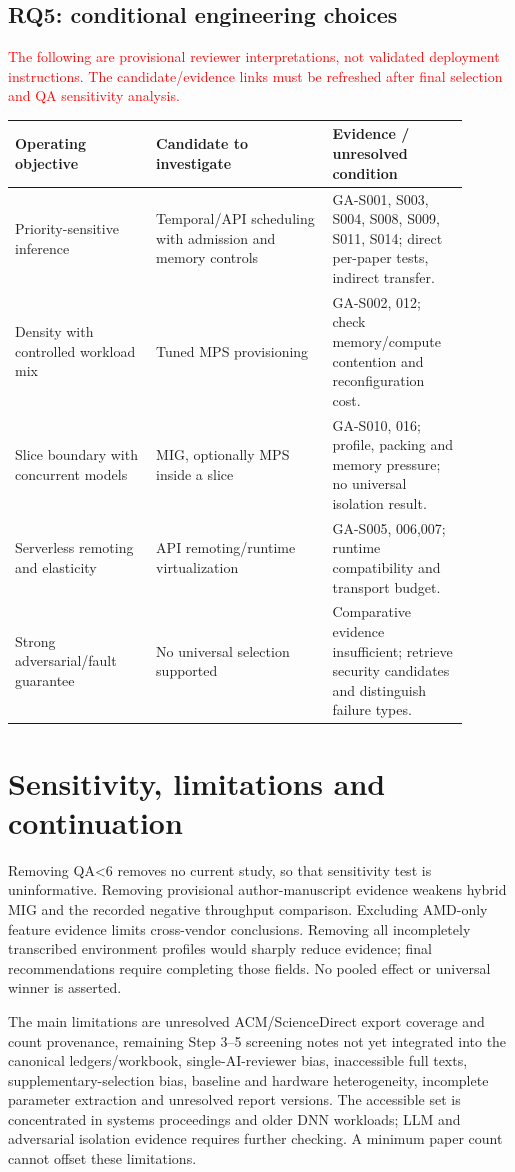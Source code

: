 \documentclass[12pt,a4paper]{article}
\newcommand{\pending}[1]{\textcolor{red}{#1}}
\begin{document}
\subsection{RQ5: conditional engineering choices}
\pending{The following are provisional reviewer interpretations, not validated deployment instructions. The candidate/evidence links must be refreshed after final selection and QA sensitivity analysis.}
\begin{longtable}{P{0.28\linewidth}P{0.35\linewidth}P{0.27\linewidth}}
\toprule Operating objective & Candidate to investigate & Evidence / unresolved condition\\\midrule\endhead
Priority-sensitive inference & Temporal/API scheduling with admission and memory controls &GA-S001,  S003,  S004,  S008,  S009,  S011,  S014; direct per-paper tests, indirect transfer.\\
Density with controlled workload mix & Tuned MPS provisioning &GA-S002, 012; check memory/compute contention and reconfiguration cost.\\
Slice boundary with concurrent models & MIG, optionally MPS inside a slice &GA-S010, 016; profile, packing and memory pressure; no universal isolation result.\\
Serverless remoting and elasticity & API remoting/runtime virtualization &GA-S005, 006,007; runtime compatibility and transport budget.\\
Strong adversarial/fault guarantee & No universal selection supported &Comparative evidence insufficient; retrieve security candidates and distinguish failure types.\\
\bottomrule\end{longtable}

\section{Sensitivity, limitations and continuation}
Removing QA<6 removes no current study, so that sensitivity test is uninformative. Removing provisional author-manuscript evidence weakens hybrid MIG and the recorded negative throughput comparison. Excluding AMD-only feature evidence limits cross-vendor conclusions. Removing all incompletely transcribed environment profiles would sharply reduce evidence; final recommendations require completing those fields. No pooled effect or universal winner is asserted.

The main limitations are unresolved ACM/ScienceDirect export coverage and count provenance, remaining Step 3--5 screening notes not yet integrated into the canonical ledgers/workbook, single-AI-reviewer bias, inaccessible full texts, supplementary-selection bias, baseline and hardware heterogeneity, incomplete parameter extraction and unresolved report versions. The accessible set is concentrated in systems proceedings and older DNN workloads; LLM and adversarial isolation evidence requires further checking. A minimum paper count cannot offset these limitations.
\end{document}
